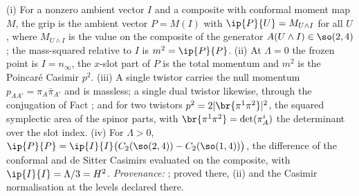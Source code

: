(i) For a nonzero ambient vector $I$ and a composite with conformal moment map $M$, the grip is the ambient vector $P = M(I)$ with $\ip{P}{U} = M_{U \wedge I}$ for all $U$, where $M_{U \wedge I}$ is the value on the composite of the generator $A(U \wedge I) \in \so(2,4)$; the mass-squared relative to $I$ is $m^{2} = \ip{P}{P}$. (ii) At $\Lambda = 0$ the frozen point is $I = n_{\infty}$, the $x$-slot part of $P$ is the total momentum and $m^{2}$ is the Poincar\'e Casimir $p^{2}$. (iii) A single twistor carries the null momentum $p_{AA'} = \pi_{A}\bar\pi_{A'}$ and is massless; a single dual twistor likewise, through the conjugation of Fact ; and for two twistors $p^{2} = 2|\br{\pi^{1}\pi^{2}}|^{2}$, the squared symplectic area of the spinor parts, with $\br{\pi^{1}\pi^{2}} = \det(\pi^{i}_{A})$ the determinant over the slot index. (iv) For $\Lambda > 0$, $\ip{P}{P} = \ip{I}{I}\bigl(C_{2}(\so(2,4)) - C_{2}(\so(1,4))\bigr)$, the difference of the conformal and de Sitter Casimirs evaluated on the composite, with $\ip{I}{I} = \Lambda/3 = H^{2}$. \emph{Provenance:} \cite[Def.~5.4, Prop.~4.1, Prop.~5.7]{ButlerT11}; proved there, (ii) and the Casimir normalisation at the levels declared there.
